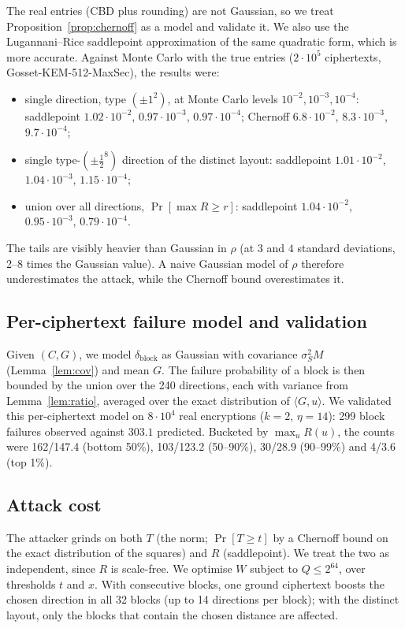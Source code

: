 \documentclass[11pt,a4paper]{article}
\theoremstyle{definition}
\theoremstyle{remark}
\begin{document}
The real entries (CBD plus rounding) are not Gaussian, so we treat Proposition~\ref{prop:chernoff} as a model and validate it. We also use the Lugannani--Rice saddlepoint approximation of the same quadratic form, which is more accurate. Against Monte Carlo with the true entries ($2\cdot10^5$ ciphertexts, Gosset-KEM-512-MaxSec), the results were:
\begin{itemize}[leftmargin=*,itemsep=1pt]
\item single direction, type $(\pm1^2)$, at Monte Carlo levels $10^{-2},10^{-3},10^{-4}$: saddlepoint $1.02\cdot10^{-2}$, $0.97\cdot10^{-3}$, $0.97\cdot10^{-4}$; Chernoff $6.8\cdot10^{-2}$, $8.3\cdot10^{-3}$, $9.7\cdot10^{-4}$;
\item single type-$(\pm\frac12^8)$ direction of the distinct layout: saddlepoint $1.01\cdot10^{-2}$, $1.04\cdot10^{-3}$, $1.15\cdot10^{-4}$;
\item union over all directions, $\Pr[\max R\ge r]$: saddlepoint $1.04\cdot10^{-2}$, $0.95\cdot10^{-3}$, $0.79\cdot10^{-4}$.
\end{itemize}
The tails are visibly heavier than Gaussian in $\rho$ (at $3$ and $4$ standard deviations, 2--8 times the Gaussian value). A naive Gaussian model of $\rho$ therefore underestimates the attack, while the Chernoff bound overestimates it.

\subsection{Per-ciphertext failure model and validation}
Given $(C,G)$, we model $\delta_{\text{block}}$ as Gaussian with covariance $\sigma_S^2M$ (Lemma~\ref{lem:cov}) and mean $G$. The failure probability of a block is then bounded by the union over the 240 directions, each with variance from Lemma~\ref{lem:ratio}, averaged over the exact distribution of $\langle G,u\rangle$. We validated this per-ciphertext model on $8\cdot10^4$ real encryptions ($k=2$, $\eta=14$): 299 block failures observed against $303.1$ predicted. Bucketed by $\max_uR(u)$, the counts were 162/147.4 (bottom 50\%), 103/123.2 (50--90\%), 30/28.9 (90--99\%) and 4/3.6 (top 1\%).

\subsection{Attack cost}
The attacker grinds on both $T$ (the norm; $\Pr[T\ge t]$ by a Chernoff bound on the exact distribution of the squares) and $R$ (saddlepoint). We treat the two as independent, since $R$ is scale-free. We optimise $W$ subject to $Q\le2^{64}$, over thresholds $t$ and $x$. With consecutive blocks, one ground ciphertext boosts the chosen direction in all 32 blocks (up to 14 directions per block); with the distinct layout, only the blocks that contain the chosen distance are affected.
\end{document}
